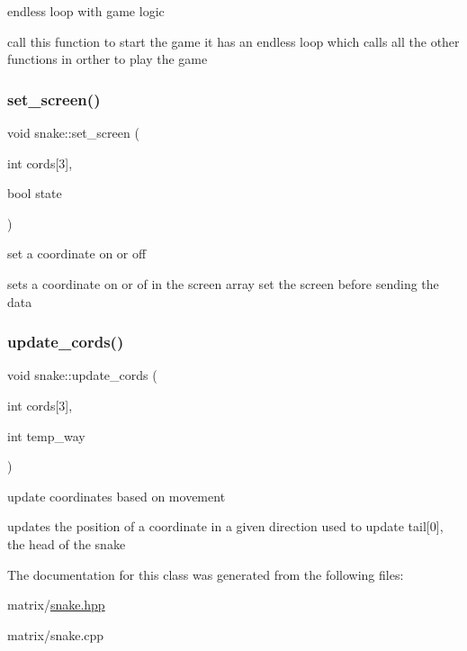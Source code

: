 endless loop with game logic 

call this function to start the game it has an endless loop which calls all the other functions in orther to play the game \mbox{\label{classsnake_a839b285241756087e4555f7629f85b56}} 
\subsubsection{\texorpdfstring{set\+\_\+screen()}{set\_screen()}}
{\footnotesize\ttfamily void snake\+::set\+\_\+screen (\begin{DoxyParamCaption}\item[{int}]{cords\mbox{[}3\mbox{]},  }\item[{bool}]{state }\end{DoxyParamCaption})}



set a coordinate on or off 

sets a coordinate on or of in the screen array set the screen before sending the data \mbox{\label{classsnake_a1f937902d3c8ebca239718ffedae8a10}} 
\subsubsection{\texorpdfstring{update\+\_\+cords()}{update\_cords()}}
{\footnotesize\ttfamily void snake\+::update\+\_\+cords (\begin{DoxyParamCaption}\item[{int}]{cords\mbox{[}3\mbox{]},  }\item[{int}]{temp\+\_\+way }\end{DoxyParamCaption})}



update coordinates based on movement 

updates the position of a coordinate in a given direction used to update tail\mbox{[}0\mbox{]}, the head of the snake 

The documentation for this class was generated from the following files\+:\begin{DoxyCompactItemize}
\item 
matrix/\hyperlink{snake_8hpp}{snake.\+hpp}\item 
matrix/snake.\+cpp\end{DoxyCompactItemize}
